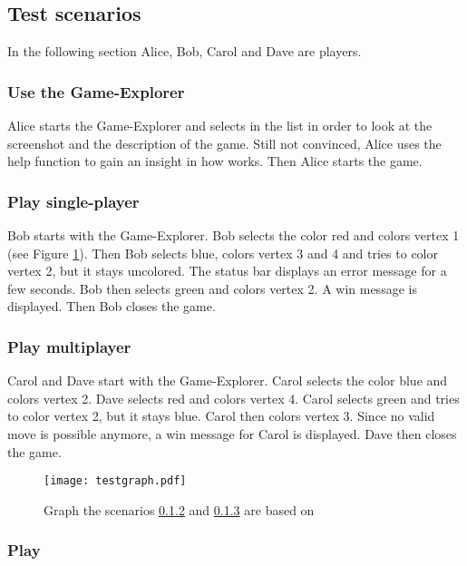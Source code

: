 \subsection{Test scenarios}

In the following section Alice, Bob, Carol and Dave are \glspl{player}.

\subsubsection{Use the Game-Explorer}

Alice starts the Game-Explorer and selects \graphcoloring in the list in order to look at the screenshot and the description of the game. Still not convinced, Alice uses the help function to gain an insight in how \graphcoloring works. Then Alice starts the game.

\subsubsection{Play \graphcoloring single-player} \label{T:GCSingle}

Bob starts \graphcoloring with the Game-Explorer. Bob selects the color red and colors vertex 1 (see Figure \ref{img:TESTGRCOL}). Then Bob selects blue, colors vertex 3 and 4 and tries to color vertex 2, but it stays uncolored. The status bar displays an error message for a few seconds. Bob then selects green and colors vertex 2. A win message is displayed. Then Bob closes the game.

\subsubsection{Play \graphcoloring multiplayer} \label{T:GCMulti}

Carol and Dave start \graphcoloring with the Game-Explorer. Carol selects the color blue and colors vertex 2. Dave selects red and colors vertex 4. Carol selects green and tries to color vertex 2, but it stays blue. Carol then colors vertex 3. Since no valid move is possible anymore, a win message for Carol is displayed. Dave then closes the game.

\begin{figure}[h!]
	\centering
	\texttt{[image: testgraph.pdf]}
	\caption{Graph the scenarios \ref{T:GCSingle} and \ref{T:GCMulti} are based on}
	\label{img:TESTGRCOL}
\end{figure}

\subsubsection{Play \twixt} \label{T:TwixT}

